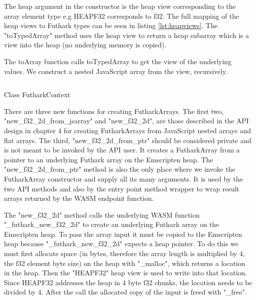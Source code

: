 \documentclass[11pt]{book}
\begin{document}
The heap argument in the constructor is the heap view corresponding to the array element type e.g HEAPF32 corresponds to f32. The full mapping of the heap views to Futhark types can be seen in listing \ref{lst:heapviews}.
The "toTypedArray" method uses the heap view to return a heap subarray which is a view into the heap (no underlying memory is copied).

The toArray function calls toTypedArray to get the view of the underlying values.
We construct a nested JavaScript array from the view, recursively.


\begin{listing}[H] 
        \inputminted[fontsize=\small,baselinestretch=0.5,linenos]{JavaScript}{code/compiler/api_examples/FutharkContext.js}
        \caption{Class FutharkContext}
        \label{lst:FutharkContext}    
\end{listing} 

There are three new functions for creating FutharkArrays. The first two, "new\_f32\_2d\_from\_jsarray" and "new\_f32\_2d", are those described in the API design in chapter 4 for creating FutharkArrays from JavaScript nested arrays and flat arrays. The third, "new\_f32\_2d\_from\_ptr" should be considered private and is not meant to be invoked by the API user. It creates a FutharkArray from a pointer to an underlying Futhark array on the Emscripten heap. The "new\_f32\_2d\_from\_ptr" method is also the only place where we invoke the FutharkArray constructor and supply all its many arguments. It is used by the two API methods and also by the entry point method wrapper to wrap result arrays returned by the WASM endpoint function.

The "new\_f32\_2d" method calls the underlying WASM function \\
"\_futhark\_new\_f32\_2d" to create an underlying Futhark array on the Emscripten heap. To pass the array input it must be copied to the Emscripten heap because "\_futhark\_new\_f32\_2d" expects a heap pointer. To do this we must first allocate space (in bytes, therefore the array length is multiplied by 4, the f32 element byte size) on the heap with "\_malloc", which returns a location in the heap. Then the "HEAPF32" heap view is used to write into that location. 
Since HEAPF32 addresses the heap in 4 byte f32 chunks, the location needs to be divided by 4.
After the call the allocated copy of the input is freed with "\_free".
\end{document}
